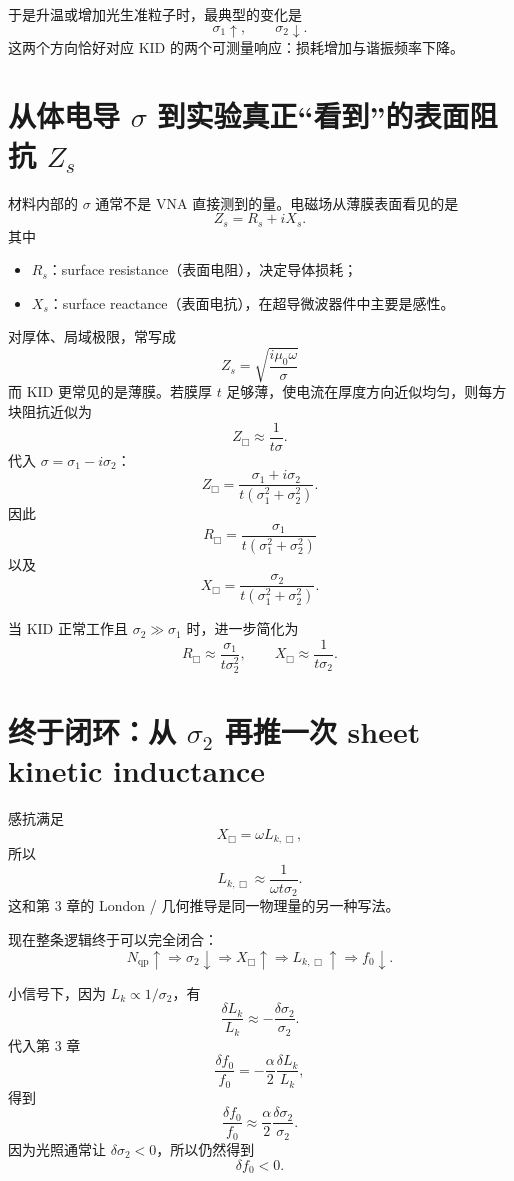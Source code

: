\documentclass[11pt,a4paper,openany]{ctexrep}
\newcommand{\qp}{\mathrm{qp}}
\begin{document}
于是升温或增加光生准粒子时，最典型的变化是
\[
\boxed{
\sigma_1\uparrow,
\qquad
\sigma_2\downarrow.
}
\]
这两个方向恰好对应 KID 的两个可测量响应：损耗增加与谐振频率下降。

\section{从体电导 $\sigma$ 到实验真正“看到”的表面阻抗 $Z_s$}

材料内部的 $\sigma$ 通常不是 VNA 直接测到的量。电磁场从薄膜表面看见的是
\[
\boxed{
Z_s=R_s+iX_s.
}
\]
其中
\begin{itemize}
  \item $R_s$：surface resistance（表面电阻），决定导体损耗；
  \item $X_s$：surface reactance（表面电抗），在超导微波器件中主要是感性。
\end{itemize}

对厚体、局域极限，常写成
\[
\boxed{
Z_s=\sqrt{\frac{i\mu_0\omega}{\sigma}}
}
\]
而 KID 更常见的是薄膜。若膜厚 $t$ 足够薄，使电流在厚度方向近似均匀，则每方块阻抗近似为
\[
\boxed{
Z_{\Box}
\approx
\frac{1}{t\sigma}.
}
\]
代入 $\sigma=\sigma_1-i\sigma_2$：
\[
Z_{\Box}
=
\frac{\sigma_1+i\sigma_2}
{t(\sigma_1^2+\sigma_2^2)}.
\]
因此
\[
\boxed{
R_{\Box}
=
\frac{\sigma_1}
{t(\sigma_1^2+\sigma_2^2)}
}
\]
以及
\[
\boxed{
X_{\Box}
=
\frac{\sigma_2}
{t(\sigma_1^2+\sigma_2^2)}.
}
\]

当 KID 正常工作且 $\sigma_2\gg\sigma_1$ 时，进一步简化为
\[
\boxed{
R_{\Box}\approx\frac{\sigma_1}{t\sigma_2^2},
\qquad
X_{\Box}\approx\frac{1}{t\sigma_2}.
}
\]

\section{终于闭环：从 $\sigma_2$ 再推一次 sheet kinetic inductance}

感抗满足
\[
X_{\Box}=\omega L_{k,\Box},
\]
所以
\[
\boxed{
L_{k,\Box}
\approx
\frac{1}{\omega t\sigma_2}.
}
\]
这和第 3 章的 London / 几何推导是同一物理量的另一种写法。

现在整条逻辑终于可以完全闭合：
\[
N_{\qp}\uparrow
\Rightarrow
\sigma_2\downarrow
\Rightarrow
X_{\Box}\uparrow
\Rightarrow
L_{k,\Box}\uparrow
\Rightarrow
f_0\downarrow.
\]

小信号下，因为 $L_k\propto1/\sigma_2$，有
\[
\frac{\delta L_k}{L_k}
\approx
-\frac{\delta\sigma_2}{\sigma_2}.
\]
代入第 3 章
\[
\frac{\delta f_0}{f_0}
=-\frac{\alpha}{2}\frac{\delta L_k}{L_k},
\]
得到
\[
\boxed{
\frac{\delta f_0}{f_0}
\approx
\frac{\alpha}{2}
\frac{\delta\sigma_2}{\sigma_2}.
}
\]
因为光照通常让 $\delta\sigma_2<0$，所以仍然得到
\[
\boxed{\delta f_0<0.}
\]
\end{document}
